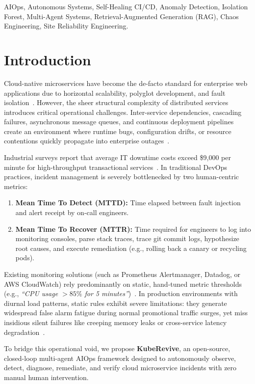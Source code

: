\documentclass[conference]{IEEEtran}
\begin{document}
\begin{IEEEkeywords}
AIOps, Autonomous Systems, Self-Healing CI/CD, Anomaly Detection, Isolation Forest, Multi-Agent Systems, Retrieval-Augmented Generation (RAG), Chaos Engineering, Site Reliability Engineering.
\end{IEEEkeywords}

\section{Introduction}
Cloud-native microservices have become the de-facto standard for enterprise web applications due to horizontal scalability, polyglot development, and fault isolation~\cite{sre_google2016}. However, the sheer structural complexity of distributed services introduces critical operational challenges. Inter-service dependencies, cascading failures, asynchronous message queues, and continuous deployment pipelines create an environment where runtime bugs, configuration drifts, or resource contentions quickly propagate into enterprise outages~\cite{microservices_faults}.

Industrial surveys report that average IT downtime costs exceed \$9,000 per minute for high-throughput transactional services~\cite{aiops_survey2025}. In traditional DevOps practices, incident management is severely bottlenecked by two human-centric metrics:
\begin{enumerate}
    \item \textbf{Mean Time To Detect (MTTD):} Time elapsed between fault injection and alert receipt by on-call engineers.
    \item \textbf{Mean Time To Recover (MTTR):} Time required for engineers to log into monitoring consoles, parse stack traces, trace git commit logs, hypothesize root causes, and execute remediation (e.g., rolling back a canary or recycling pods).
\end{enumerate}

Existing monitoring solutions (such as Prometheus Alertmanager, Datadog, or AWS CloudWatch) rely predominantly on static, hand-tuned metric thresholds (e.g., \textit{``CPU usage $> 85\%$ for 5 minutes''})~\cite{prometheus_monitoring}. In production environments with diurnal load patterns, static rules exhibit severe limitations: they generate widespread false alarm fatigue during normal promotional traffic surges, yet miss insidious silent failures like creeping memory leaks or cross-service latency degradation~\cite{automap2020}.

To bridge this operational void, we propose \textbf{KubeRevive}, an open-source, closed-loop multi-agent AIOps framework designed to autonomously observe, detect, diagnose, remediate, and verify cloud microservice incidents with zero manual human intervention.
\end{document}
